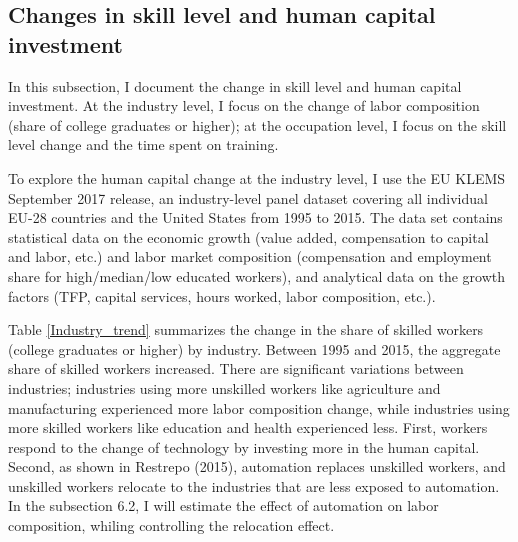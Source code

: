 \documentclass[12pt]{article}
\begin{document}
\subsection{Changes in skill level and human capital investment}
In this subsection, I document the change in skill level and human capital investment. At the industry level, I focus on the change of labor composition (share of college graduates or higher); at the occupation level, I focus on the skill level change and the time spent on training. 
 
To explore the human capital change at the industry level, I use the EU KLEMS September 2017 release, an industry-level panel dataset covering all individual EU-28 countries and the United States from 1995 to 2015. The data set contains statistical data on the economic growth (value added, compensation to capital and labor, etc.) and labor market composition (compensation and employment share for high/median/low educated workers), and analytical data on the growth factors (TFP, capital services, hours worked, labor composition, etc.). 

Table \ref{Industry_trend} summarizes the change in the share of skilled workers (college graduates or higher) by industry. Between 1995 and 2015, the aggregate share of skilled workers increased. There are significant variations between industries; industries using more unskilled workers like agriculture and manufacturing experienced more labor composition change, while industries using more skilled workers like education and health experienced less. First, workers respond to the change of technology by investing more in the human capital. Second, as shown in Restrepo (2015)\nocite{Restrepo2015}, automation replaces unskilled workers, and unskilled workers relocate to the industries that are less exposed to automation. In the subsection 6.2, I will estimate the effect of automation on labor composition, whiling controlling the relocation effect. 
\end{document}
